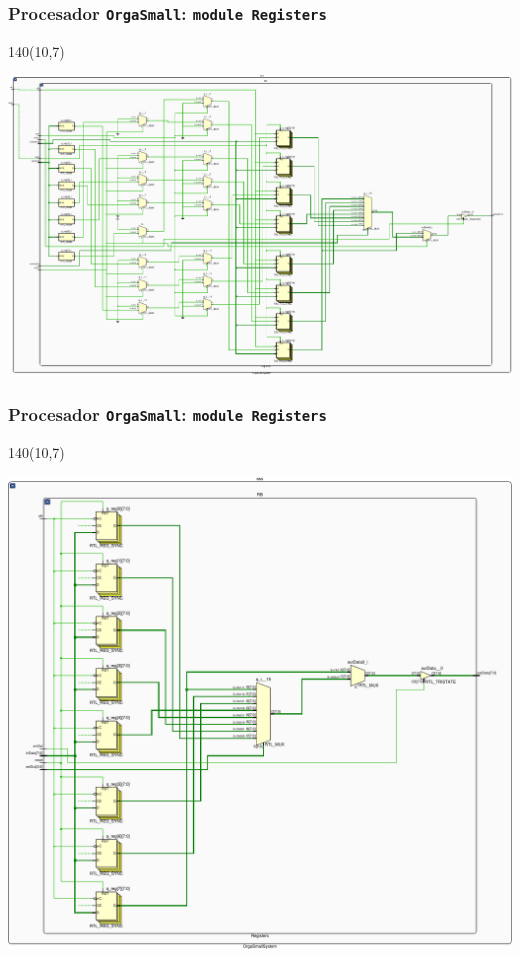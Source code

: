 \documentclass[aspectratio=169]{beamer}
\begin{document}
\begin{frame}[fragile,t]
    \frametitle{Procesador \texttt{OrgaSmall}: \texttt{module Registers}}
    \begin{textblock}{140}(10,7)
    \begin{center}
    \includegraphics[scale=0.68]{pdf/schematicRB-crop.pdf}
    \end{center}
    \end{textblock}
\end{frame}

\begin{frame}[fragile,t]
    \frametitle{Procesador \texttt{OrgaSmall}: \texttt{module Registers}}
    \begin{textblock}{140}(10,7)
    \begin{center}
    \includegraphics[scale=0.43]{pdf/schematicRB2-crop.pdf}
    \end{center}
    \end{textblock}
\end{frame}
\end{document}
